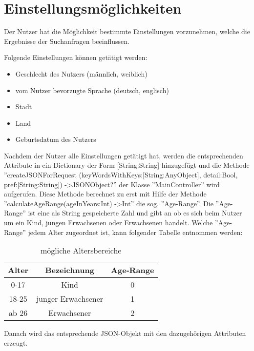 
\chapter{Einstellungsmöglichkeiten}

Der Nutzer hat die Möglichkeit bestimmte Einstellungen vorzunehmen, welche die Ergebnisse der Suchanfragen beeinflussen.   

Folgende Einstellungen können getätigt werden:

\begin{itemize}
	\item Geschlecht des Nutzers (männlich, weiblich)
	\item vom Nutzer bevorzugte Sprache (deutsch, englisch)
	\item Stadt
	\item Land
	\item Geburtsdatum des Nutzers
\end{itemize}


Nachdem der Nutzer alle Einstellungen getätigt hat, werden die entsprechenden Attribute in
ein Dictionary der Form [String:String] hinzugefügt und die Methode ''createJSONForRequest
(keyWordsWithKeys:[String:AnyObject],
detail:Bool, pref:[String:String]) -\textgreater JSONObject?'' der Klasse ''MainController'' wird aufgerufen. Diese Methode berechnet zu erst mit Hilfe der Methode ''calculateAgeRange(ageInYears:Int) -\textgreater Int'' die sog. ''Age-Range''. Die ''Age-Range'' ist eine als String gespeicherte Zahl und gibt an ob es sich beim Nutzer um ein Kind, jungen Erwachsenen oder Erwachsenen handelt. Welche ''Age-Range'' jedem Alter zugeordnet ist, kann folgender Tabelle entnommen werden:

\begin{table}[h]
	\centering
	\begin{tabular}{c|c|c}
		Alter & Bezeichnung & Age-Range \\
		\hline
		0-17 & Kind & 0 \\
		18-25 & junger Erwachsener & 1 \\
		ab 26 & Erwachsener & 2
	\end{tabular}
	\caption{mögliche Altersbereiche}
	\label{tab:Altersbereiche}
\end{table}

Danach wird das entsprechende JSON-Objekt mit den dazugehörigen Attributen erzeugt.

